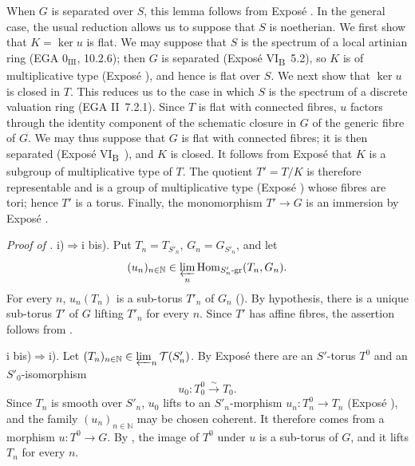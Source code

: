 When \(G\) is separated over \(S\), this lemma follows from
Exposé . In the general case, the usual reduction allows us to
suppose that \(S\) is noetherian. We first show that
\(K=\ker u\) is flat. We may suppose that \(S\) is the spectrum of a
local artinian ring (EGA \(0_{\mathrm{III}}\), 10.2.6); then \(G\) is
separated (Exposé VI\textsubscript{B}~5.2), so \(K\) is of
multiplicative type (Exposé ), and hence is flat over \(S\).
We next show that \(\ker u\) is closed in \(T\). This reduces us to
the case in which \(S\) is the spectrum of a discrete valuation ring
(EGA II~7.2.1). Since \(T\) is flat with connected fibres, \(u\)
factors through the identity component of the schematic closure in
\(G\) of the generic fibre of \(G\). We may thus suppose that \(G\)
is flat with connected fibres; it is then separated
(Exposé VI\textsubscript{B}~), and \(K\) is closed.
It follows from Exposé  that \(K\) is a subgroup of
multiplicative type of \(T\). The quotient \(T'=T/K\) is therefore
representable and is a group of multiplicative type
(Exposé ) whose fibres are tori; hence \(T'\) is a torus.
Finally, the monomorphism \(T'\to G\) is an immersion by
Exposé .

\medskip\noindent\textit{Proof of .}
\textup{i)}\(\Rightarrow\)\textup{i bis)}.
Put \(T_n=T_{S'_n}\), \(G_n=G_{S'_n}\), and let
\[
 (u_n)_{n\in\mathbb N}\in
 \varprojlim_n\operatorname{Hom}_{S'_n\text{-gr}}(T_n,G_n).
\]
For every \(n\), \(u_n(T_n)\) is a sub-torus \(T'_n\) of \(G_n\)
(). By hypothesis, there is a unique sub-torus \(T'\) of
\(G\) lifting \(T'_n\) for every \(n\). Since \(T'\) has affine
fibres, the assertion follows from .

\textup{i bis)}\(\Rightarrow\)\textup{i)}.
Let
\((T_n)_{n\in\mathbb N}\in\varprojlim_n\mathcal T(S'_n)\).
By Exposé  there are an \(S'\)-torus \(T^0\) and an
\(S'_0\)-isomorphism
\[
  u_0:T^0_0\xrightarrow{\sim}T_0.
\]
Since \(T_n\) is smooth over \(S'_n\), \(u_0\) lifts to an
\(S'_n\)-morphism \(u_n:T^0_n\to T_n\) (Exposé ), and the
family \((u_n)_{n\in\mathbb N}\) may be chosen coherent. It therefore
comes from a morphism \(u:T^0\to G\). By , the image of
\(T^0\) under \(u\) is a sub-torus of \(G\), and it lifts \(T_n\)
for every \(n\).

